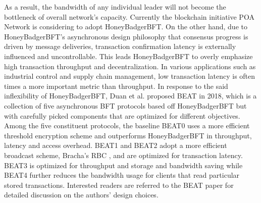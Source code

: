 As a result, the bandwidth of any individual leader will not become the bottleneck of overall network's capacity.
Currently the blockchain initiative POA Network  is considering to adopt HoneyBadgerBFT.
On the other hand, due to HoneyBadgerBFT's asynchronous design philosophy that consensus progress is driven by message deliveries, transaction confirmation latency is externally influenced and uncontrollable. This leads HoneyBadgerBFT to overly emphasize high transaction throughput and decentralization.
In various applications such as industrial control and supply chain management, low transaction latency is often times a more important metric than throughput. 
{\color{\rcolor}
In response to the said inflexibility of HoneyBadgerBFT, Duan et al.  proposed BEAT in 2018, which is a collection of five asynchronous BFT protocols based off HoneyBadgerBFT but with carefully picked components that are optimized for different objectives.
Among the five constituent protocols, the baseline BEAT0 uses a more efficient threshold encryption scheme  and outperforms HoneyBadgerBFT in throughput, latency and access overhead. BEAT1 and BEAT2 adopt a more efficient broadcast scheme, Bracha's RBC , and are optimized for transaction latency. BEAT3 is optimized for throughput and storage and bandwidth saving while BEAT4 further reduces the bandwidth usage for clients that read particular stored transactions.
Interested readers are referred to the BEAT paper  for detailed discussion on the authors' design choices. 
}

